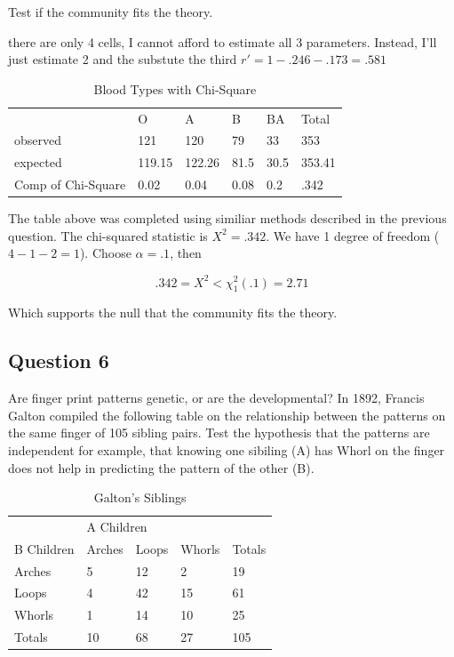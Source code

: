 \documentclass{tufte-book}
\theoremstyle{mytheoremstyle}
\theoremstyle{mylemstyle}
\theoremstyle{mydefstyle}
\begin{document}
Test if the community fits the theory. 

 there are only 4 cells, I cannot afford to estimate all 3 parameters.  Instead, I'll just estimate 2 and the substute the third $r'= 1- .246 -.173 = .581$



\begin{table}
\centering
\caption{Blood Types with Chi-Square}
\label{blod2}
\begin{tabular}{l|lllll}
                   & O      & A      & B    & BA   & Total  \\ \cline{2-6}
observed           & 121    & 120    & 79   & 33   & 353    \\
expected           & 119.15 & 122.26 & 81.5 & 30.5 & 353.41 \\
Comp of Chi-Square &0.02&0.04&0.08&0.2&.342\\
\end{tabular}
\end{table}

The table above was completed using similiar methods described in the previous question.  The chi-squared statistic is $X^2 = .342$.  We have 1 degree of freedom ($4-1-2 = 1$).  Choose $\alpha=.1$, then

\[ .342 = X^2 < \chi_1^2(.1) = 2.71 \]

Which supports the null that the community fits the theory.


\subsection{Question 6}
Are finger print patterns genetic, or are the developmental?  In 1892, Francis Galton compiled the following table on the relationship between the patterns on the same finger of 105 sibling pairs.  Test the hypothesis that the patterns are independent for example, that knowing one sibiling (A) has Whorl on the finger does not help in predicting the pattern of the other (B).

\begin{table}
\centering
\caption{Galton's Siblings}
\label{galton}
\begin{tabular}{l|lll|l}
           & \multicolumn{3}{l}{A Children}                                    &        \\
B Children & \multicolumn{1}{l|}{Arches} & \multicolumn{1}{l|}{Loops} & Whorls & Totals \\ \hline
Arches     & \multicolumn{1}{l|}{5}      & \multicolumn{1}{l|}{12}    & 2      & 19     \\ \hline
Loops      & \multicolumn{1}{l|}{4}      & \multicolumn{1}{l|}{42}    & 15     & 61     \\ \hline
Whorls     & \multicolumn{1}{l|}{1}      & \multicolumn{1}{l|}{14}    & 10     & 25     \\ \hline
Totals     & \multicolumn{1}{l|}{10}     & \multicolumn{1}{l|}{68}    & 27     & 105    \\ \hline
\end{tabular}
\end{table}
\end{document}
